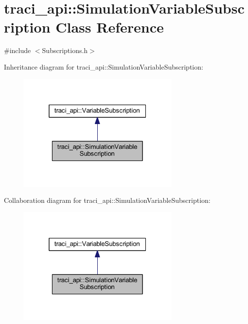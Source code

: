 \hypertarget{classtraci__api_1_1_simulation_variable_subscription}{}\section{traci\+\_\+api\+:\+:Simulation\+Variable\+Subscription Class Reference}
\label{classtraci__api_1_1_simulation_variable_subscription}


{\ttfamily \#include $<$Subscriptions.\+h$>$}



Inheritance diagram for traci\+\_\+api\+:\+:Simulation\+Variable\+Subscription\+:
\nopagebreak
\begin{figure}[H]
\begin{center}
\leavevmode
\includegraphics[width=229pt]{classtraci__api_1_1_simulation_variable_subscription__inherit__graph}
\end{center}
\end{figure}


Collaboration diagram for traci\+\_\+api\+:\+:Simulation\+Variable\+Subscription\+:
\nopagebreak
\begin{figure}[H]
\begin{center}
\leavevmode
\includegraphics[width=229pt]{classtraci__api_1_1_simulation_variable_subscription__coll__graph}
\end{center}
\end{figure}
